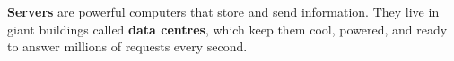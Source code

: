 \sectionrule

\begin{bigidea}
  \textbf{Servers} are powerful computers that store and send information.
  They live in giant buildings called \textbf{data centres},
  which keep them cool, powered, and ready to answer millions of requests every second.
\end{bigidea}

